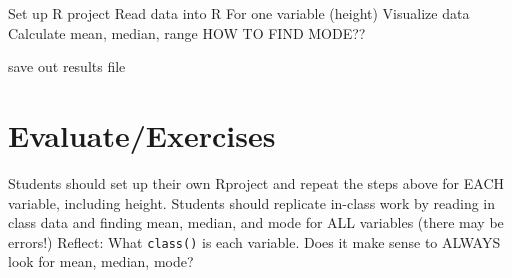 \documentclass[
]{book}
\begin{document}
Set up R project
Read data into R
For one variable (height)
Visualize data
Calculate mean, median, range
HOW TO FIND MODE??

save out results file

\hypertarget{evaluateexercises-5}{%
\section{Evaluate/Exercises}\label{evaluateexercises-5}}

Students should set up their own Rproject and repeat the steps above for EACH
variable, including height.
Students should replicate in-class work by reading in class data and finding mean, median, and mode for ALL variables (there may be errors!)
Reflect: What \texttt{class()} is each variable. Does it make sense to ALWAYS look for mean, median, mode?

  
\end{document}
